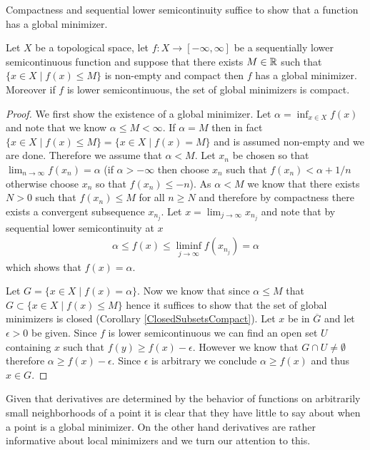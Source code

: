 Compactness and sequential lower semicontinuity suffice to show that
a function has a global minimizer.
\begin{thm}Let $X$ be a topological space, let $f : X \to [-\infty,
  \infty]$ be a sequentially lower
  semicontinuous function and suppose that there exists $M \in \mathbb{R}$
  such that $\lbrace x \in X \mid f(x) \leq M \rbrace$ is non-empty
  and compact then
  $f$ has a global minimizer.  Moreover if $f$ is lower
  semicontinuous, the set of global minimizers
  is compact.
\end{thm}
\begin{proof}
We first show the existence of a global minimizer.  Let $\alpha = \inf_{x \in X} f(x)$ and note that we know $\alpha \leq
M < \infty$.  If $\alpha = M$ then in fact $\lbrace x \in X \mid f(x)
\leq M \rbrace  = \lbrace x \in X \mid f(x) = M \rbrace $ and is assumed
non-empty and we are done.  Therefore we assume that $\alpha < M$.  Let $x_n$ be chosen so that
$\lim_{n \to \infty} f(x_n) = \alpha$ (if $\alpha > -\infty$ then
choose $x_n$ such that $f(x_n) < \alpha + 1/n$ otherwise choose $x_n$
so that $f(x_n) \leq -n$).  As $\alpha < M$ we know that there exists
$N>0$ such that $f(x_n) \leq M$ for all $n \geq N$ and therefore by
compactness there exists a convergent subsequence $x_{n_j}$.  Let $x =
\lim_{j \to \infty} x_{n_j}$ and note that by sequential lower semicontinuity
at $x$
\begin{align*}
\alpha \leq f(x) \leq \liminf_{j \to \infty} f(x_{n_j}) = \alpha
\end{align*}
which shows that $f(x) = \alpha$.

Let $G = \lbrace x \in X \mid f(x) = \alpha \rbrace$.  Now we know
that since $\alpha \leq M$  that $G \subset \lbrace x \in X \mid f(x)
\leq M \rbrace$ hence it suffices to show that the set of global
minimizers is closed (Corollary \ref{ClosedSubsetsCompact}).  Let $x$
be in $\overline{G}$ and let $\epsilon > 0$ be given.  Since $f$ is
lower semicontinuous we can find an open set $U$ containing $x$ such
that $f(y) \geq f(x) - \epsilon$.  However we know that $G \cap U \neq
\emptyset$ therefore $\alpha \geq f(x) - \epsilon$.  Since $\epsilon$
is arbitrary we conclude $\alpha \geq f(x)$ and thus $x \in G$.  
\end{proof}


Given that derivatives are determined by the behavior of functions on
arbitrarily small neighborhoods of a point it is clear that they have
little to say about when a point is a global minimizer.  On the other
hand derivatives are rather informative about local minimizers and we
turn our attention to this.

